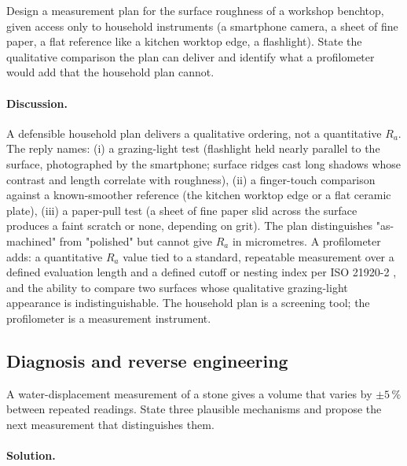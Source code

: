\begin{exercise}
Design a measurement plan for the surface roughness of a workshop
benchtop, given access only to household instruments (a smartphone
camera, a sheet of fine paper, a flat reference like a kitchen
worktop edge, a flashlight). State the qualitative comparison the
plan can deliver and identify what a profilometer would add that the
household plan cannot.
\end{exercise}

\paragraph{Discussion.}
A defensible household plan delivers a qualitative ordering, not a
quantitative $R_{a}$. The reply names: (i) a grazing-light test
(flashlight held nearly parallel to the surface, photographed by
the smartphone; surface ridges cast long shadows whose contrast and
length correlate with roughness), (ii) a finger-touch comparison
against a known-smoother reference (the kitchen worktop edge or a
flat ceramic plate), (iii) a paper-pull test (a sheet of fine paper
slid across the surface produces a faint scratch or none, depending
on grit). The plan distinguishes "as-machined" from "polished" but
cannot give $R_{a}$ in micrometres. A profilometer adds: a
quantitative $R_{a}$ value tied to a standard, repeatable
measurement over a defined evaluation length and a defined cutoff
or nesting index per ISO 21920-2 \cite{std:iso-21920-2-2021}, and
the ability to compare two surfaces whose qualitative grazing-light
appearance is indistinguishable. The household plan is a
screening tool; the profilometer is a measurement instrument.

\subsection*{Diagnosis and reverse engineering}

\begin{exercise}
A water-displacement measurement of a stone gives a volume that
varies by $\pm 5\,\%$ between repeated readings. State three plausible
mechanisms and propose the next measurement that distinguishes them.
\end{exercise}

\paragraph{Solution.}

